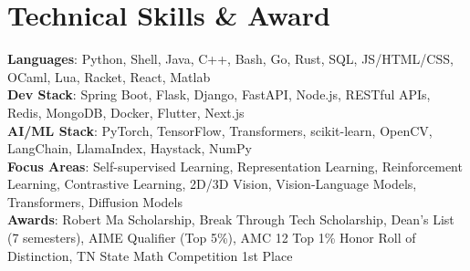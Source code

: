 \documentclass[letterpaper,11pt]{article}
\begin{document}
\section{Technical Skills \& Award}
 \begin{itemize}[leftmargin=0.15in, label={}]
    \small{\item{
     \textbf{Languages}{: Python, Shell, Java, C++, Bash, Go, Rust, SQL, JS/HTML/CSS, OCaml, Lua, Racket, React, Matlab} \\

     \textbf{Dev Stack}{: Spring Boot, Flask, Django, FastAPI, Node.js, RESTful APIs, Redis, MongoDB, Docker, Flutter, Next.js} \\

     \textbf{AI/ML Stack}{: PyTorch, TensorFlow, Transformers, scikit-learn, OpenCV, LangChain, LlamaIndex, Haystack, NumPy} \\
    \textbf{Focus Areas}{: Self-supervised Learning, Representation Learning, Reinforcement Learning, Contrastive Learning, 2D/3D Vision, Vision-Language Models, Transformers, Diffusion Models}
    \\
     \textbf{Awards}{: Robert Ma Scholarship, Break Through Tech Scholarship, Dean’s List (7 semesters), AIME Qualifier (Top 5\%), AMC 12 Top 1\% Honor Roll of Distinction, TN State Math Competition 1st Place}
    }
    
  
    }
    
 \end{itemize}
 
\end{document}
